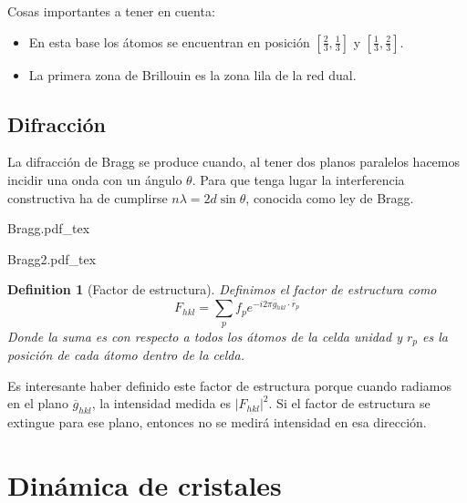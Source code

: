 \documentclass[leqno]{article}
\newtheorem*{definition}{Definition}
\newcommand{\incfig}[1]{%
\center
\def\svgwidth{0.9\columnwidth}
{#1.pdf_tex}
}
\begin{document}
Cosas importantes a tener en cuenta:
\begin{itemize}[topsep=-6pt, itemsep=0pt]
  \item En esta base los átomos se encuentran en posición $[\frac{2}{3}, \frac{1}{3}]$ y $[\frac{1}{3}, \frac{2}{3}]$.
  \item La primera zona de Brillouin es la zona lila de la red dual.
\end{itemize}

\subsection{Difracción}
La difracción de Bragg se produce cuando, al tener dos planos paralelos hacemos incidir una onda con un ángulo $\theta$. Para que tenga lugar la interferencia constructiva ha de cumplirse $n\lambda= 2d \sin\theta $, conocida como ley de Bragg.

\begin{minipage}{0.4\textwidth}
  \incfig{Bragg}
\end{minipage}
\begin{minipage}{0.6\textwidth}
  \incfig{Bragg2}
\end{minipage}

\begin{definition}[Factor de estructura] Definimos el factor de estructura como
  \[
  F_{hkl} = \sum_p f_p e^{-i2\pi \overline{g}_{hkl}\cdot \overline{r}_p}
  \] 
  Donde la suma es con respecto a todos los átomos de la celda unidad y $r_p$ es la posición de cada átomo dentro de la celda.
\end{definition}

Es interesante haber definido este factor de estructura porque cuando radiamos en el plano $\overline{g}_{hkl}$, la intensidad medida es $|F_{hkl}|^2$. Si el factor de estructura se extingue para ese plano, entonces no se medirá intensidad en esa dirección.



\section{Dinámica de cristales}
\end{document}
